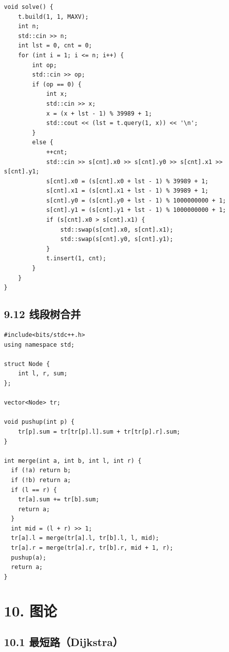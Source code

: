 \documentclass[UTF8,a4paper,11pt]{ctexart}
\begin{document}
\begin{Verbatim}[fontsize=\small,frame=single,breaklines=true,breakanywhere=true]
void solve() {
    t.build(1, 1, MAXV);
    int n;
    std::cin >> n;
    int lst = 0, cnt = 0;
    for (int i = 1; i <= n; i++) {
        int op;
        std::cin >> op;
        if (op == 0) {
            int x;
            std::cin >> x;
            x = (x + lst - 1) % 39989 + 1;
            std::cout << (lst = t.query(1, x)) << '\n';
        }
        else {
            ++cnt;
            std::cin >> s[cnt].x0 >> s[cnt].y0 >> s[cnt].x1 >> s[cnt].y1;
            s[cnt].x0 = (s[cnt].x0 + lst - 1) % 39989 + 1;
            s[cnt].x1 = (s[cnt].x1 + lst - 1) % 39989 + 1;
            s[cnt].y0 = (s[cnt].y0 + lst - 1) % 1000000000 + 1;
            s[cnt].y1 = (s[cnt].y1 + lst - 1) % 1000000000 + 1;
            if (s[cnt].x0 > s[cnt].x1) {
                std::swap(s[cnt].x0, s[cnt].x1);
                std::swap(s[cnt].y0, s[cnt].y1);
            }
            t.insert(1, cnt);
        }
    } 
}

\end{Verbatim}

\subsection*{9.12 线段树合并}

\begin{Verbatim}[fontsize=\small,frame=single,breaklines=true,breakanywhere=true]
#include<bits/stdc++.h>
using namespace std;

struct Node {
    int l, r, sum;
};

vector<Node> tr;

void pushup(int p) {
    tr[p].sum = tr[tr[p].l].sum + tr[tr[p].r].sum;
}

int merge(int a, int b, int l, int r) {
  if (!a) return b;
  if (!b) return a;
  if (l == r) {
    tr[a].sum += tr[b].sum;
    return a;
  }
  int mid = (l + r) >> 1;
  tr[a].l = merge(tr[a].l, tr[b].l, l, mid);
  tr[a].r = merge(tr[a].r, tr[b].r, mid + 1, r);
  pushup(a);
  return a;
}

\end{Verbatim}

\section*{10. 图论}

\subsection*{10.1 最短路（Dijkstra）}
\end{document}

